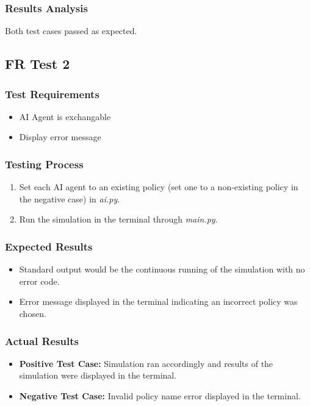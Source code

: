 \documentclass[12pt, titlepage]{article}
\providecommand{\DIFaddbegin}{} %
\providecommand{\DIFaddend}{} %
\begin{document}
\subsubsection{Results Analysis}
\item Both test cases passed as expected. 

\subsection{FR Test 2}\DIFaddbegin \label{FRT2} 
\DIFaddend \subsubsection{Test Requirements}
\begin{itemize}
    \item AI Agent is exchangable
    \item Display error message
\end{itemize}
\subsubsection{Testing Process}
\begin{enumerate}
    \item Set each AI agent to an existing policy (set one to a non-existing policy in the negative case) in \textit{ai.py}.
    \item Run the simulation in the terminal through \textit{main.py}.
\end{enumerate}
\subsubsection{Expected Results}
\begin{itemize}
    \item Standard output would be the continuous running of the simulation with no error code.
    \item Error message displayed in the terminal indicating an incorrect policy was chosen.
\end{itemize}
\subsubsection{Actual Results}
\begin{itemize}
    \item \textbf{Positive Test Case:} Simulation ran accordingly and results of the simulation were displayed in the terminal.
    \item \textbf{Negative Test Case:} Invalid policy name error displayed in the terminal.
\end{itemize}
\end{document}
